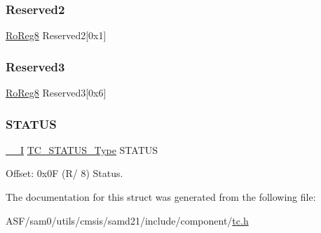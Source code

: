 \subsubsection{\texorpdfstring{Reserved2}{Reserved2}}
{\footnotesize\ttfamily \mbox{\hyperlink{group___s_a_m_d21_e15_a__definitions_ga0d957f1433aaf5d70e4dc2b68288442d}{Ro\+Reg8}} Reserved2\mbox{[}0x1\mbox{]}}

\mbox{\label{struct_tc_count16_a068f74ca484a01ac64b9e382439e5fc7}} 
\subsubsection{\texorpdfstring{Reserved3}{Reserved3}}
{\footnotesize\ttfamily \mbox{\hyperlink{group___s_a_m_d21_e15_a__definitions_ga0d957f1433aaf5d70e4dc2b68288442d}{Ro\+Reg8}} Reserved3\mbox{[}0x6\mbox{]}}

\mbox{\label{struct_tc_count16_af7f33b0963c8311ce45fe0f929a1a9c5}} 
\subsubsection{\texorpdfstring{STATUS}{STATUS}}
{\footnotesize\ttfamily \mbox{\hyperlink{core__cm0plus_8h_af63697ed9952cc71e1225efe205f6cd3}{\+\_\+\+\_\+I}} \mbox{\hyperlink{union_t_c___s_t_a_t_u_s___type}{T\+C\+\_\+\+S\+T\+A\+T\+U\+S\+\_\+\+Type}} S\+T\+A\+T\+US}



Offset\+: 0x0F (R/ 8) Status. 



The documentation for this struct was generated from the following file\+:\begin{DoxyCompactItemize}
\item 
A\+S\+F/sam0/utils/cmsis/samd21/include/component/\mbox{\hyperlink{utils_2cmsis_2samd21_2include_2component_2tc_8h}{tc.\+h}}\end{DoxyCompactItemize}
